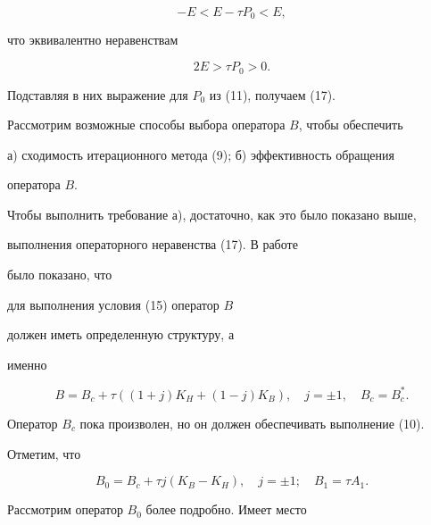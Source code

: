 $$ 


-E < E-\tau P_0 <E, 


$$ 


что эквивалентно неравенствам 


$$ 


2E > \tau P_0 >0. 


$$ 


Подставляя в них выражение для $P_0$ из (11), получаем (17). 


 


Рассмотрим возможные способы выбора оператора $B$, чтобы обеспечить  


 


а) сходимость итерационного метода (9); б) эффективность обращения 


оператора $B$. 


 


Чтобы выполнить требование а), достаточно, как это было показано выше, 


выполнения операторного неравенства (17). В работе \cite{Kru2} 


было показано, что 


для выполнения условия (15) оператор $B$ 


должен иметь определенную структуру, а 


именно 


\begin{equation} 


B=B_c+\tau ((1+j)K_H +(1-j)K_B),\quad j=\pm 1,\quad B_c=B_c^*. 


\end{equation} 


 


Оператор $B_c$ пока произволен, но он должен обеспечивать выполнение (10). 


Отметим, что  


\begin{equation} 


B_0 =B_c+\tau j(K_B - K_H),\quad j=\pm 1;\quad B_1=\tau A_1. 


\end{equation} 


 


Рассмотрим оператор $B_0$ более подробно. Имеет место 


\bigskip





